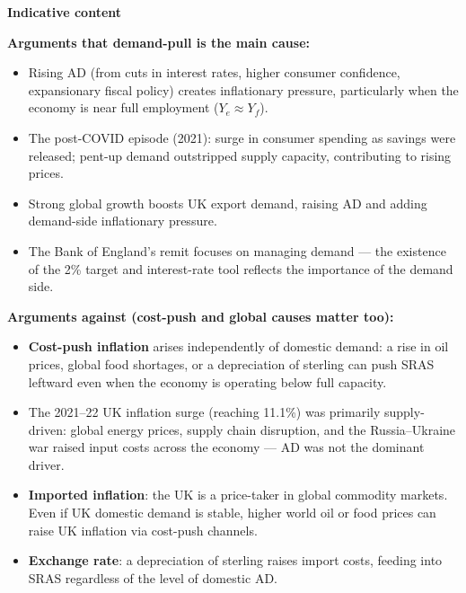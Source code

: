 \documentclass[12pt,a4paper]{article}
\begin{document}
\vspace{0.8em}

\textbf{Indicative content}

\vspace{0.3em}
\textbf{Arguments that demand-pull is the main cause:}
\begin{itemize}
    \item Rising AD (from cuts in interest rates, higher consumer confidence, expansionary fiscal policy) creates inflationary pressure, particularly when the economy is near full employment ($Y_e \approx Y_f$).
    \item The post-COVID episode (2021): surge in consumer spending as savings were released; pent-up demand outstripped supply capacity, contributing to rising prices.
    \item Strong global growth boosts UK export demand, raising AD and adding demand-side inflationary pressure.
    \item The Bank of England's remit focuses on managing demand --- the existence of the 2\% target and interest-rate tool reflects the importance of the demand side.
\end{itemize}

\vspace{0.3em}
\textbf{Arguments against (cost-push and global causes matter too):}
\begin{itemize}
    \item \textbf{Cost-push inflation} arises independently of domestic demand: a rise in oil prices, global food shortages, or a depreciation of sterling can push SRAS leftward even when the economy is operating below full capacity.
    \item The 2021--22 UK inflation surge (reaching 11.1\%) was primarily supply-driven: global energy prices, supply chain disruption, and the Russia--Ukraine war raised input costs across the economy --- AD was not the dominant driver.
    \item \textbf{Imported inflation}: the UK is a price-taker in global commodity markets. Even if UK domestic demand is stable, higher world oil or food prices can raise UK inflation via cost-push channels.
    \item \textbf{Exchange rate}: a depreciation of sterling raises import costs, feeding into SRAS regardless of the level of domestic AD.
\end{itemize}
\end{document}
